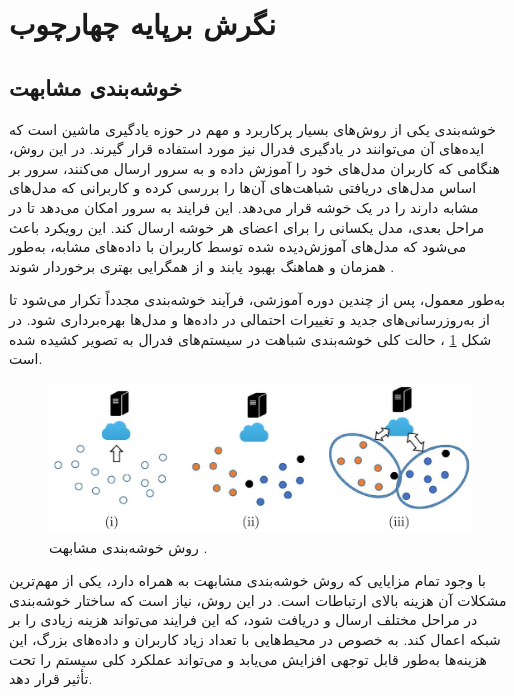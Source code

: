\section{نگرش برپایه چهارچوب}
\subsection{
	خوشه‌بندی مشابهت%
}
خوشه‌بندی یکی از روش‌های بسیار پرکاربرد و مهم در حوزه یادگیری ماشین است که ایده‌های آن می‌توانند در یادگیری فدرال نیز مورد استفاده قرار گیرند. در این روش، هنگامی که کاربران مدل‌های خود را آموزش داده و به سرور ارسال می‌کنند، سرور بر اساس مدل‌های دریافتی شباهت‌های آن‌ها را بررسی کرده و کاربرانی که مدل‌های مشابه دارند را در یک خوشه قرار می‌دهد. این فرایند به سرور امکان می‌دهد تا در مراحل بعدی، مدل یکسانی را برای اعضای هر خوشه ارسال کند. این رویکرد باعث می‌شود که مدل‌های آموزش‌دیده شده توسط کاربران با داده‌های مشابه، به‌طور همزمان و هماهنگ بهبود یابند و از همگرایی بهتری برخوردار شوند
\cite{ghosh2019robust}.

به‌طور معمول، پس از چندین دوره آموزشی، فرآیند خوشه‌بندی مجدداً تکرار می‌شود تا از به‌روزرسانی‌های جدید و تغییرات احتمالی در داده‌ها و مدل‌ها بهره‌برداری شود. در شکل
\ref{similarity_clustering}%
، حالت کلی خوشه‌بندی شباهت در سیستم‌های فدرال به تصویر کشیده شده است.


\begin{figure}[b]
	\centering
	\includegraphics[scale=0.9]{images/chap3/similarity_clustering.png}%
	\caption{%
		روش خوشه‌بندی مشابهت 
		\cite{ghosh2019robust}%
		.
	}
	\label{similarity_clustering}
	\centering
\end{figure}




با وجود تمام مزایایی که روش خوشه‌بندی مشابهت به همراه دارد، یکی از مهم‌ترین مشکلات آن هزینه بالای ارتباطات است. در این روش، نیاز است که ساختار خوشه‌بندی در مراحل مختلف ارسال و دریافت شود، که این فرایند می‌تواند هزینه زیادی را بر شبکه اعمال کند. به خصوص در محیط‌هایی با تعداد زیاد کاربران و داده‌های بزرگ، این هزینه‌ها به‌طور قابل توجهی افزایش می‌یابد و می‌تواند عملکرد کلی سیستم را تحت تأثیر قرار دهد.

